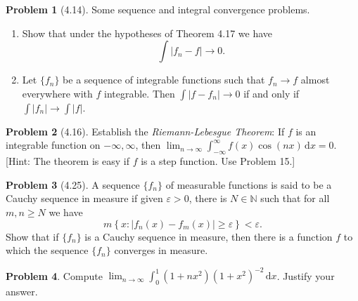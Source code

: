 \documentclass[12pt]{article}
\newcommand{\N}{\mathbb{N}}
\renewcommand{\epsilon}{\varepsilon}
\newcommand{\dif}{\, \mathrm{d}}
\theoremstyle{definition}
\newtheorem{problem}{Problem}
\begin{document}
\begin{problem}[4.14] 
    Some sequence and integral convergence problems.
    \begin{enumerate}[label = (\alph{*})]
        \item Show that under the hypotheses of Theorem 4.17 we have
            \[
                \int \left| f_n - f \right| \to 0.  
            \]
        \item Let \( \{f_n\} \) be a sequence of integrable functions such that \( f_n \to f \) almost everywhere with \( f \) integrable. Then \( \displaystyle \int |f - f_n| \to 0 \) if and only if \( \displaystyle \int |f_n| \to \int |f| \).
    \end{enumerate}


\end{problem}

\begin{problem}[4.16]
    Establish the \emph{Riemann-Lebesgue Theorem}: If \( f \) is an integrable function on 
    \( -\infty, \infty \), then \( \displaystyle \lim_{n \to \infty} \int_{-\infty}^{\infty} f(x) \cos(nx) \dif x = 0 \). [Hint: The theorem is easy if \( f \) is a step function. Use Problem 15.]


\end{problem}  

\begin{problem}[4.25]

    A sequence \( \{f_n\} \) of measurable functions is said to be a Cauchy sequence in measure if given \( \epsilon > 0 \), there is \( N \in \N \) such that for all \( m, n \geq N \) we have 
        \[
            m \left\{ x: \left| f_n(x) - f_m(x) \right| \geq \epsilon \right\} < \epsilon.
        \]
    Show that if \( \{f_n\} \) is a Cauchy sequence in measure, 
    then there is a function \( f \) to which the sequence \( \{f_n\} \) converges in measure. 
    
\end{problem}


\begin{problem}

    Compute \( \displaystyle \lim_{n \to \infty} \int_{0}^{1} (1 + nx^{2})(1 + x^{2})^{-2} \dif x \). Justify your answer.
    
\end{problem}
\end{document}
